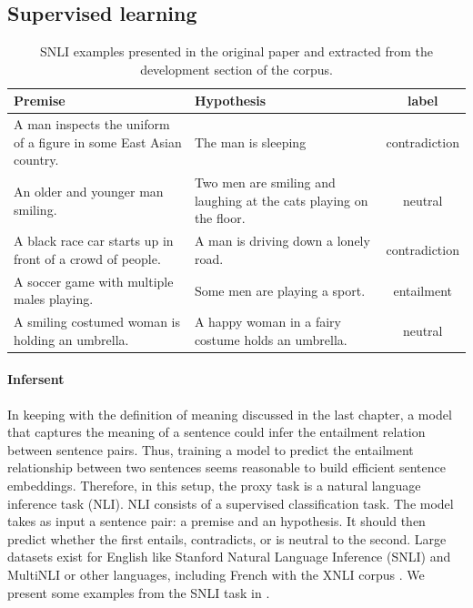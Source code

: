 
\subsection{Supervised learning}

\begin{table}[!htb]
\centering
\footnotesize
\begin{tabularx}{16cm}{@{}X X c@{} }
  \toprule
Premise & Hypothesis & label \\
\midrule
\midrule 
A man inspects the uniform of a figure in some East Asian country. & The man is sleeping & contradiction\\
\rule{0pt}{3ex}An older and younger man smiling. & Two men are smiling and laughing at the cats playing on the floor. & neutral\\
\rule{0pt}{3ex}A black race car starts up in front of a crowd of people. & A man is driving down a lonely road. & contradiction\\
\rule{0pt}{3ex}A soccer game with multiple males playing. & Some men are playing a sport. & entailment\\
\rule{0pt}{3ex}A smiling costumed woman is holding an umbrella. & A happy woman in a fairy costume holds an umbrella. & neutral\\
\bottomrule
\end{tabularx}
\caption{ SNLI examples presented in the original paper \parencite{bowman_15} and extracted from the development section of the corpus.}
\end{table}


\paragraph{Infersent} In keeping with the definition of meaning discussed in the last chapter, a model that captures the meaning of a sentence could infer the entailment relation between sentence pairs. Thus, training a model to predict the entailment relationship between two sentences seems reasonable to build efficient sentence embeddings. Therefore, in this setup, the proxy task is a natural language inference task (NLI). NLI consists of a supervised classification task. The model takes as input a sentence pair: a premise and an hypothesis. It should then predict whether the first entails, contradicts, or is neutral to the second. Large datasets exist for English like Stanford Natural Language Inference (SNLI) \parencite{bowman_15} and MultiNLI \parencite{williams_18b} or other languages, including French with the XNLI corpus \parencite{conneau_18b}. We present some examples from the SNLI task in .


